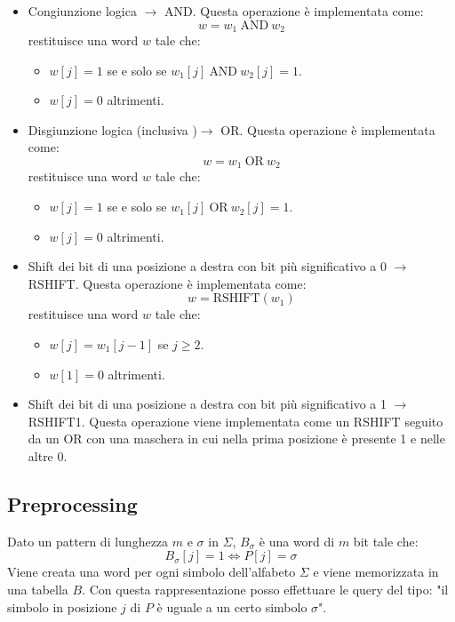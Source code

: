 \begin{itemize}
    \item Congiunzione logica $\to$ AND. Questa operazione è implementata come:
          \begin{equation}
              w = w_1 \ \text{AND} \ w_2
          \end{equation}
          restituisce una word $w$ tale che:
          \begin{itemize}
              \item $w[j] = 1$ se e solo se $w_1[j] \ \text{AND} \ w_2[j] =  1$.
              \item $w[j] = 0$ altrimenti.
          \end{itemize}
    \item Disgiunzione logica (inclusiva )$\to$ OR. Questa operazione è implementata come:
          \begin{equation}
              w = w_1 \ \text{OR} \ w_2
          \end{equation}
          restituisce una word $w$ tale che:
          \begin{itemize}
              \item $w[j] = 1$ se e solo se $w_1[j] \ \text{OR} \ w_2[j] =  1$.
              \item $w[j] = 0$ altrimenti.
          \end{itemize}
    \item Shift dei bit di una posizione a destra con bit più significativo a 0
          $\to$ RSHIFT. Questa operazione è implementata come:
          \begin{equation}
              w = \text{RSHIFT}(w_1)
          \end{equation}
          restituisce una word $w$ tale che:
          \begin{itemize}
              \item $w[j] = w_1[j - 1]$ se $j \geq 2$.
              \item $w[1] = 0$ altrimenti.
          \end{itemize}
    \item Shift dei bit di una posizione a destra con bit più significativo a 1
          $\to$ RSHIFT1. Questa operazione viene implementata come un RSHIFT seguito
          da un OR con una maschera in cui nella prima posizione è presente 1 e nelle altre 0.
\end{itemize}
\subsection{Preprocessing}
Dato un pattern di lunghezza $m$ e $\sigma$ in $\Sigma$, $B_{\sigma}$ è una word
di $m$ bit tale che:
\begin{equation}
    B_{\sigma}[j] = 1 \iff P[j] = \sigma
\end{equation}
Viene creata una word per ogni simbolo dell'alfabeto $\Sigma$ e viene memorizzata
in una tabella $B$. Con questa rappresentazione posso effettuare le query del tipo:
"il simbolo in posizione $j$ di $P$ è uguale a un certo simbolo $\sigma$".

